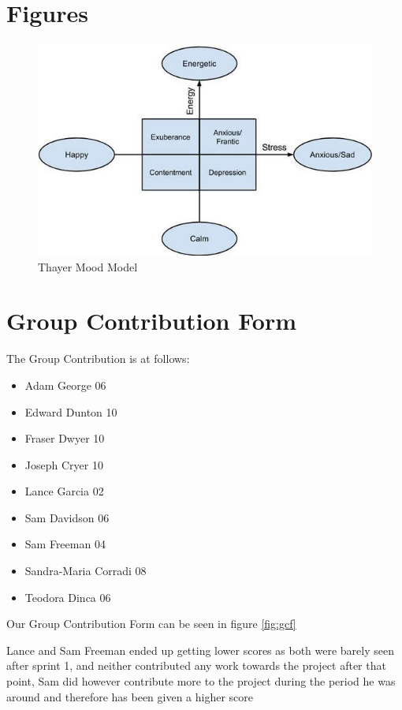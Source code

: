 \documentclass[11pt]{report}
\begin{document}
\section{Figures}

\begin{figure}[h]
	\includegraphics[width=\linewidth]{thayer-mood-model.png}
	\caption{Thayer Mood Model}
	\label{fig:thayermoodmodel}
\end{figure}

\newpage
\section{Group Contribution Form}

The Group Contribution is at follows:
\begin{itemize}
\item Adam George			06
\item Edward Dunton		10
\item Fraser Dwyer			10
\item Joseph Cryer			10
\item Lance Garcia			02
\item Sam Davidson			06
\item Sam Freeman 			04
\item Sandra-Maria Corradi	08
\item Teodora Dinca    		06
\end{itemize}

Our Group Contribution Form can be seen in figure \ref{fig:gcf}

Lance and Sam Freeman ended up getting lower scores as both were barely seen after sprint 1, and neither contributed any work towards the project after that point, Sam did however contribute more to the project during the period he was around and therefore has been given a higher score
\end{document}
